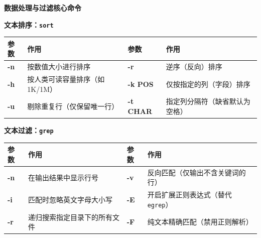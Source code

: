 \documentclass[multi=page, border=15pt, varwidth=16cm]{standalone}
\newcommand{\thnode}[1]{\textcolor{headertext}{\bfseries #1}}
\begin{document}
\begin{page}
	\centering
	\textbf{\Large 数据处理与过滤核心命令} \\ \vspace{0.8em}

	\textbf{文本排序：\texttt{sort}} \\ \vspace{0.4em}
	\begin{tabularx}{\linewidth}{>{\bfseries}l X >{\bfseries}l X}
		\toprule
		\rowcolor{headerbg}
		\thnode{参数} & \thnode{作用}        & \thnode{参数} & \thnode{作用}     \\
		\midrule
		-n          & 按数值大小进行排序          & -r          & 逆序（反向）排序        \\
		-h          & 按人类可读容量排序（如 1K/1M） & -k POS      & 仅按指定的列（字段）排序    \\
		-u          & 剔除重复行（仅保留唯一行）      & -t CHAR     & 指定列分隔符（缺省默认为空格） \\
		\bottomrule
	\end{tabularx}

	\vspace{1.5em}

	\textbf{文本过滤：\texttt{grep}} \\ \vspace{0.4em}
	\begin{tabularx}{\linewidth}{>{\bfseries}l X >{\bfseries}l X}
		\toprule
		\rowcolor{headerbg}
		\thnode{参数} & \thnode{作用}    & \thnode{参数} & \thnode{作用}                  \\
		\midrule
		-n          & 在输出结果中显示行号     & -v          & 反向匹配（仅输出不含关键词的行）             \\
		-i          & 匹配时忽略英文字母大小写   & -E          & 开启扩展正则表达式（替代 \texttt{egrep}） \\
		-r          & 递归搜索指定目录下的所有文件 & -F          & 纯文本精确匹配（禁用正则解析）              \\
		\bottomrule
	\end{tabularx}
\end{page}
\end{document}
